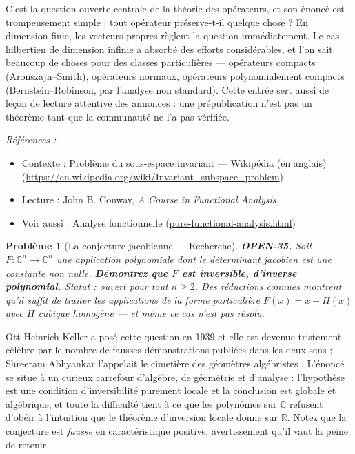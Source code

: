 \documentclass[11pt]{article}
\newtheorem{problem}{Problème}
\newenvironment{refs}{\par\small\noindent\emph{Références :}\begin{itemize}\setlength\itemsep{0pt}}{\end{itemize}\normalsize}
\begin{document}
\noindent C'est la question ouverte centrale de la théorie des opérateurs, et son
énoncé est trompeusement simple : tout opérateur préserve-t-il quelque chose ? En dimension
finie, les vecteurs propres règlent la question immédiatement. Le cas hilbertien de
dimension infinie a absorbé des efforts considérables, et l'on sait beaucoup de choses pour
des classes particulières --- opérateurs compacts (Aronszajn--Smith), opérateurs normaux,
opérateurs polynomialement compacts (Bernstein--Robinson, par l'analyse non standard). Cette
entrée sert aussi de leçon de lecture attentive des annonces : une prépublication n'est pas
un théorème tant que la communauté ne l'a pas vérifiée.

\begin{refs}
\item Contexte : Problème du sous-espace invariant --- Wikipédia (en anglais) (\url{https://en.wikipedia.org/wiki/Invariant_subspace_problem})
\item Lecture : John B. Conway, \textit{A Course in Functional Analysis}
\item Voir aussi : Analyse fonctionnelle (\url{pure-functional-analysis.html})
\end{refs}

\bigskip

\begin{problem}[{La conjecture jacobienne --- Recherche}]
\textbf{OPEN-35.} Soit $ F : \mathbb{C}^n \to \mathbb{C}^n $ une
application polynomiale dont le déterminant jacobien est une constante non nulle.
\textbf{Démontrez que $ F $ est inversible, d'inverse polynomial.} Statut : ouvert pour
tout $ n \geq 2 $. Des réductions connues montrent qu'il suffit de traiter les
applications de la forme particulière $ F(x) = x + H(x) $ avec $ H $ cubique homogène
--- et même ce cas n'est pas résolu.
\end{problem}

\noindent Ott-Heinrich Keller a posé cette question en 1939 et elle est devenue
tristement célèbre par le nombre de fausses démonstrations publiées dans les deux sens ;
Shreeram Abhyankar l'appelait \og{} le cimetière des géomètres algébristes \fg{}. L'énoncé se situe
à un curieux carrefour d'algèbre, de géométrie et d'analyse : l'hypothèse est une condition
d'inversibilité purement locale et la conclusion est globale et algébrique, et toute la
difficulté tient à ce que les polynômes sur $ \mathbb{C} $ refusent d'obéir à l'intuition
que le théorème d'inversion locale donne sur $ \mathbb{R} $. Notez que la conjecture est
\textit{fausse} en caractéristique positive, avertissement qu'il vaut la peine de retenir.
\end{document}
